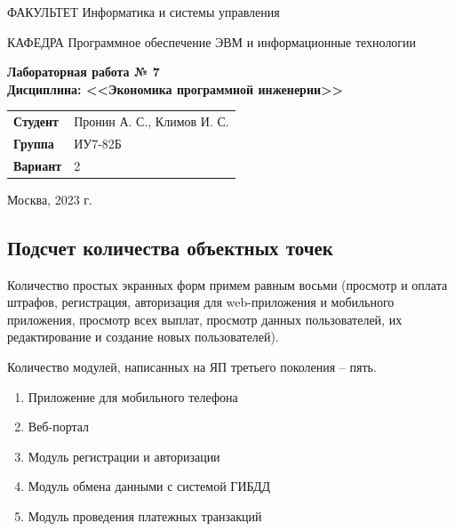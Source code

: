 \documentclass[a4paper,14pt]{article}
\begin{document}
\begin{titlepage}
    \begin{flushleft}
        ФАКУЛЬТЕТ Информатика и системы управления
    \end{flushleft}
    КАФЕДРА Программное обеспечение ЭВМ и информационные технологии

    \vspace{3cm}

    \begin{center}
        \textbf{Лабораторная работа № 7} \\
        \textbf{Дисциплина: <<Экономика программной инженерии>>}
        \vspace{0.5cm}
    \end{center}


    \vspace{3cm}

    \begin{flushleft}
        \begin{tabular}{ll}
            \textbf{Студент}       & Пронин А. С., Климов И. С. \\
            \textbf{Группа}        & ИУ7-82Б           \\
            \textbf{Вариант}       & 2           \\
        \end{tabular}
    \end{flushleft}

    \vspace{3cm}

    \begin{center}
        Москва, 2023 г.
    \end{center}

\end{titlepage}

\setcounter{page}{2}

\subsection*{Подсчет количества объектных точек}

Количество простых экранных форм примем равным восьми (просмотр и оплата штрафов, регистрация, авторизация для web-приложения и мобильного приложения, просмотр всех выплат, просмотр данных пользователей, их редактирование и создание новых пользователей).

Количество модулей, написанных на ЯП третьего поколения -- пять.
\begin{enumerate}
    \item Приложение для мобильного телефона
    \item Веб-портал
    \item Модуль регистрации и авторизации
    \item Модуль обмена данными с системой ГИБДД
    \item Модуль проведения платежных транзакций
\end{enumerate}
\end{document}
